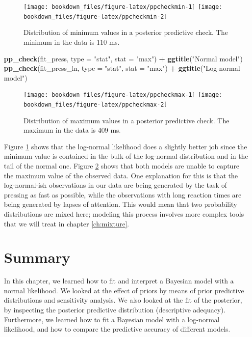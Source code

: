 \documentclass[12pt,]{krantz}
\newenvironment{Shaded}{\begin{snugshade}}{\end{snugshade}}
\newcommand{\KeywordTok}[1]{\textcolor[rgb]{0.13,0.29,0.53}{\textbf{#1}}}
\newcommand{\DataTypeTok}[1]{\textcolor[rgb]{0.13,0.29,0.53}{#1}}
\newcommand{\StringTok}[1]{\textcolor[rgb]{0.31,0.60,0.02}{#1}}
\newcommand{\OperatorTok}[1]{\textcolor[rgb]{0.81,0.36,0.00}{\textbf{#1}}}
\newcommand{\NormalTok}[1]{#1}
\theoremstyle{definition}
\theoremstyle{definition}
\theoremstyle{definition}
\theoremstyle{remark}
\begin{document}
\begin{figure}
\texttt{[image: bookdown\_files/figure-latex/ppcheckmin-1]} \texttt{[image: bookdown\_files/figure-latex/ppcheckmin-2]} \caption{Distribution of minimum values in a posterior predictive check. The minimum in the data is 110 ms.}\label{fig:ppcheckmin}
\end{figure}

\begin{Shaded}
\begin{Highlighting}[]
\KeywordTok{pp_check}\NormalTok{(fit_press, }\DataTypeTok{type =} \StringTok{"stat"}\NormalTok{, }\DataTypeTok{stat =} \StringTok{"max"}\NormalTok{) }\OperatorTok{+}\StringTok{ }\KeywordTok{ggtitle}\NormalTok{(}\StringTok{"Normal model"}\NormalTok{)}
\KeywordTok{pp_check}\NormalTok{(fit_press_ln, }\DataTypeTok{type =} \StringTok{"stat"}\NormalTok{, }\DataTypeTok{stat =} \StringTok{"max"}\NormalTok{) }\OperatorTok{+}\StringTok{ }\KeywordTok{ggtitle}\NormalTok{(}\StringTok{"Log-normal model"}\NormalTok{)}
\end{Highlighting}
\end{Shaded}

\begin{figure}
\texttt{[image: bookdown\_files/figure-latex/ppcheckmax-1]} \texttt{[image: bookdown\_files/figure-latex/ppcheckmax-2]} \caption{Distribution of maximum values in a posterior predictive check. The maximum in the data is 409 ms.}\label{fig:ppcheckmax}
\end{figure}

Figure \ref{fig:ppcheckmin} shows that the log-normal likelihood does a
slightly better job since the minimum value is contained in the bulk of
the log-normal distribution and in the tail of the normal one. Figure
\ref{fig:ppcheckmax} shows that both models are unable to capture the
maximum value of the observed data. One explanation for this is that the
log-normal-ish observations in our data are being generated by the task
of pressing as fast as possible, while the observations with long
reaction times are being generated by lapses of attention. This would
mean that two probability distributions are mixed here; modeling this
process involves more complex tools that we will treat in chapter
\ref{ch:mixture}.

\section{Summary}\label{summary}

In this chapter, we learned how to fit and interpret a Bayesian model
with a normal likelihood. We looked at the effect of priors by means of
prior predictive distributions and sensitivity analysis. We also looked
at the fit of the posterior, by inspecting the posterior predictive
distribution (descriptive adequacy). Furthermore, we learned how to fit
a Bayesian model with a log-normal likelihood, and how to compare the
predictive accuracy of different models.
\end{document}
